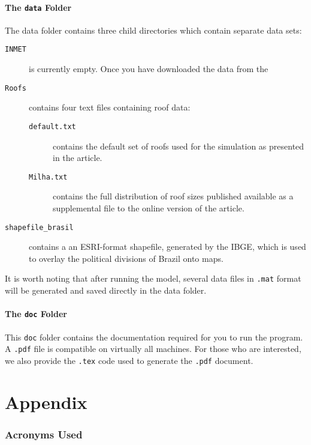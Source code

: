 \documentclass[11pt]{article} %
\newcommand{\fn}[1]{\texttt{#1}} %
\newcommand{\code}[1]{\texttt{#1}} %
\begin{document}
\subsection{The \fn{data} Folder} \label{dfolder}
The data folder contains three child directories which contain separate data sets:
\begin{description}
\item[\fn{INMET}] is currently empty. Once you have downloaded the data from the \
\item[\fn{Roofs}] contains four text files containing roof data:
\begin{description}
\item[\fn{default.txt}] contains the default set of roofs used for the simulation as presented in the article.
\item[\fn{Milha.txt}] contains the full distribution of roof sizes published available as a supplemental file to the online version of the article.
\end{description}
\item[\fn{shapefile\_brasil}] contains a an ESRI-format shapefile, generated by the \ac{IBGE}, which is used to overlay the political divisions of Brazil onto maps.
\end{description}
It is worth noting that after running the model, several data files in \fn{.mat} format will be generated and saved directly in the data folder.

\subsection{The \fn{doc} Folder} \label{doc}
This \fn{doc} folder contains the documentation required for you to run the program.
A \code{.pdf} file is compatible on virtually all machines.
For those who are interested, we also provide the \code{.tex} code used to generate the \code{.pdf} document.


\appendix
\clearpage
\part*{Appendix}

\section{Acronyms Used}

\begin{acronym}[INMET] %
\end{acronym}

\end{document}
